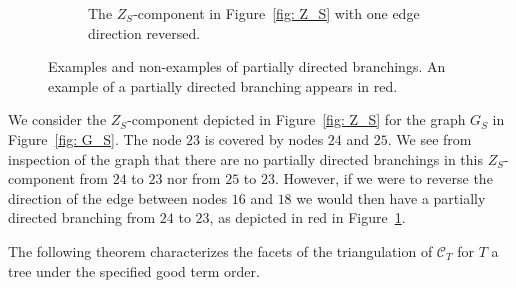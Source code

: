 \begin{example}
\begin{figure}
\begin{subfigure}[b]{0.45\textwidth}
         \caption{The $Z_S$-component in Figure~\ref{fig: Z_S} with one edge direction reversed.}
         \label{fig: Z_S aug}
     \end{subfigure}
        \caption{Examples and non-examples of partially directed branchings.  An example of a partially directed branching appears in red.}
        \label{fig: covers and branching}
\end{figure}

    We consider the $Z_S$-component depicted in Figure~\ref{fig: Z_S} for the graph $G_S$ in Figure~\ref{fig: G_S}.
    The node $23$ is covered by nodes $24$ and $25$. We see from inspection of the graph that there are no partially directed branchings in this $Z_S$-component from $24$ to $23$ nor from $25$ to $23$.  
    However, if we were to reverse the direction of the edge between nodes $16$ and $18$ we would then have a partially directed branching from $24$ to $23$, as depicted in red in Figure~\ref{fig: Z_S aug}.
\end{example}

The following theorem characterizes the facets of the triangulation of $\mathcal{C}_T$ for $T$ a tree under the specified good term order.

